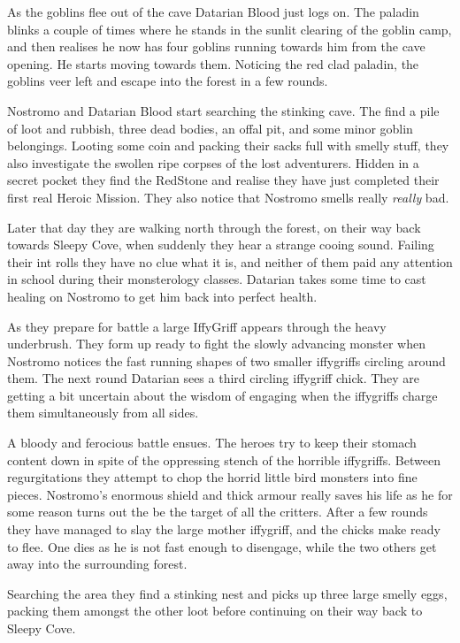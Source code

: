 As the goblins flee out of the cave Datarian Blood just logs on. The paladin blinks a couple of times where he stands in the sunlit clearing of the goblin camp, and then realises he now has four goblins running towards him from the cave opening. He starts moving towards them. Noticing the red clad paladin, the goblins veer left and escape into the forest in a few rounds.

Nostromo and Datarian Blood start searching the stinking cave. The find a pile of loot and rubbish, three dead bodies, an offal pit, and some minor goblin belongings. Looting some coin and packing their sacks full with smelly stuff, they also investigate the swollen ripe corpses of the lost adventurers. Hidden in a secret pocket they find the RedStone and realise they have just completed their first real Heroic Mission. They also notice that Nostromo smells really \emph{really} bad.

Later that day they are walking north through the forest, on their way back towards Sleepy Cove, when suddenly they hear a strange cooing sound. Failing their int rolls they have no clue what it is, and neither of them paid any attention in school during their monsterology classes. Datarian takes some time to cast healing on Nostromo to get him back into perfect health.

As they prepare for battle a large IffyGriff appears through the heavy underbrush. They form up ready to fight the slowly advancing monster when Nostromo notices the fast running shapes of two smaller iffygriffs circling around them. The next round Datarian sees a third circling iffygriff chick. They are getting a bit uncertain about the wisdom of engaging when the iffygriffs charge them simultaneously from all sides.

A bloody and ferocious battle ensues. The heroes try to keep their stomach content down in spite of the oppressing stench of the horrible iffygriffs. Between regurgitations they attempt to chop the horrid little bird monsters into fine pieces. Nostromo's enormous shield and thick armour really saves his life as he for some reason turns out the be the target of all the critters. After a few rounds they have managed to slay the large mother iffygriff, and the chicks make ready to flee. One dies as he is not fast enough to disengage, while the two others get away into the surrounding forest.

Searching the area they find a stinking nest and picks up three large smelly eggs, packing them amongst the other loot before continuing on their way back to Sleepy Cove.

